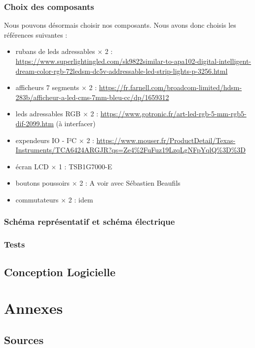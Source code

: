 \documentclass[12pt]{article}
\begin{document}
	\subsubsection{Choix des composants}
	Nous pouvons désormais choisir nos composants. Nous avons donc choisis les références suivantes :
	\begin{itemize}[label=$-$]
		\item rubans de leds adressables $\times$ 2 : \url{https://www.superlightingled.com/sk9822similar-to-apa102-digital-intelligent-dream-color-rgb-72ledsm-dc5v-addressable-led-strip-lights-p-3256.html}
		\item afficheurs 7 segments $\times$ 2 : \url{https://fr.farnell.com/broadcom-limited/hdsm-283b/afficheur-a-led-cms-7mm-bleu-cc/dp/1659312}
		\item leds adressables RGB $\times$ 2 : \url{https://www.gotronic.fr/art-led-rgb-5-mm-rgb5-dif-2099.htm} (à interfacer)
		\item expendeurs IO - I²C $\times$ 2 : \url{https://www.mouser.fr/ProductDetail/Texas-Instruments/TCA6424ARGJR?qs=Ze4%2FuFuz19LzqLgNFpYqlQ%3D%3D}
		\item écran LCD $\times$ 1 : TSB1G7000-E
		\item boutons poussoirs $\times$ 2 : A voir avec Sébastien Beaufils
		\item commutateurs $\times$ 2 : idem
	\end{itemize}
	\subsubsection{Schéma représentatif et schéma électrique}
	\subsubsection{Tests}
	\subsection{Conception Logicielle}
	
	\section{Annexes}
	\subsection{Sources}
\end{document}
